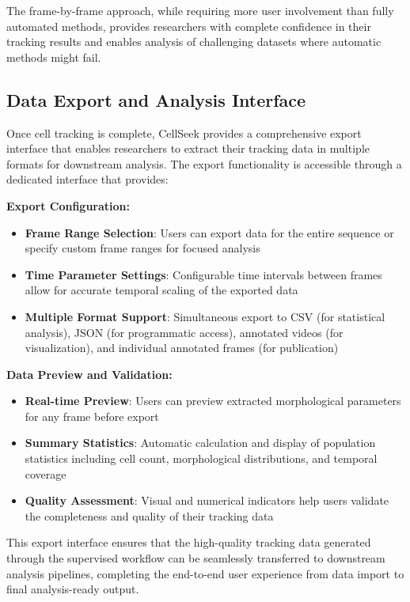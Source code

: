 \documentclass[../cellseek_paper.tex]{subfiles}
\begin{document}
The frame-by-frame approach, while requiring more user involvement than fully automated methods, provides researchers with complete confidence in their tracking results and enables analysis of challenging datasets where automatic methods might fail.

\subsection{Data Export and Analysis Interface}

Once cell tracking is complete, CellSeek provides a comprehensive export interface that enables researchers to extract their tracking data in multiple formats for downstream analysis. The export functionality is accessible through a dedicated interface that provides:

\textbf{Export Configuration:}
\begin{itemize}
  \item \textbf{Frame Range Selection}: Users can export data for the entire sequence or specify custom frame ranges for focused analysis
  \item \textbf{Time Parameter Settings}: Configurable time intervals between frames allow for accurate temporal scaling of the exported data
  \item \textbf{Multiple Format Support}: Simultaneous export to CSV (for statistical analysis), JSON (for programmatic access), annotated videos (for visualization), and individual annotated frames (for publication)
\end{itemize}

\textbf{Data Preview and Validation:}
\begin{itemize}
  \item \textbf{Real-time Preview}: Users can preview extracted morphological parameters for any frame before export
  \item \textbf{Summary Statistics}: Automatic calculation and display of population statistics including cell count, morphological distributions, and temporal coverage
  \item \textbf{Quality Assessment}: Visual and numerical indicators help users validate the completeness and quality of their tracking data
\end{itemize}

This export interface ensures that the high-quality tracking data generated through the supervised workflow can be seamlessly transferred to downstream analysis pipelines, completing the end-to-end user experience from data import to final analysis-ready output.
\end{document}
